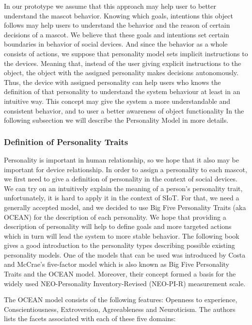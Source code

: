 In our prototype we assume that this approach may help user to better understand the mascot behavior. Knowing which goals, intentions this object follows may help users to understand the behavior and the reason of certain decisions of a mascot. We believe that these goals and intentions set certain boundaries in behavior of social devices. And since the behavior as a whole consists of actions, we suppose that personality model sets implicit instructions to the devices. Meaning that, instead of the user giving explicit instructions to the object, the object with the assigned personality makes decisions autonomously. Thus, the device with assigned personality can help users who knows the definition of that personality to understand the system behaviour at least in an intuitive way.
This concept may give the system a more understandable and consistent behavior, and to user a better awareness of object functionality
In the following subsection we will describe the Personality Model in more details.

\subsubsection{Definition of Personality Traits}
\label{sec:Definition of Personality Traits}

Personality is important in human relationship, so we hope that it also may be important for device relationship. In order to assign a personality to each mascot, we first need to give a definition of personality in the context of social devices. We can try on an intuitively explain the meaning of a person’s personality trait, unfortunately, it is hard to apply it in the context of SIoT. For that, we need a generally accepted model, and we decided to use Big Five Personality Traits (aka OCEAN) for the description of each personality. We hope that providing a description of personality will help to define goals and more targeted actions which in turn will lead the system to more stable behavior. The following book ~\cite{matthews2003personality} gives a good introduction to the personality types describing possible existing personality models. One of the models that can be used was introduced by Costa and McCrae’s five-factor model which is also known as Big Five Personality Traits and the OCEAN model. Moreover, their concept formed a basis for the widely used NEO-Personality Inventory-Revised (NEO-PI-R) measurement scale.

\par The OCEAN model consists of the following features: Openness to experience, Conscientiousness, Extroversion, Agreeableness and Neuroticism. The authors lists the facets associated with each of these five domains:

